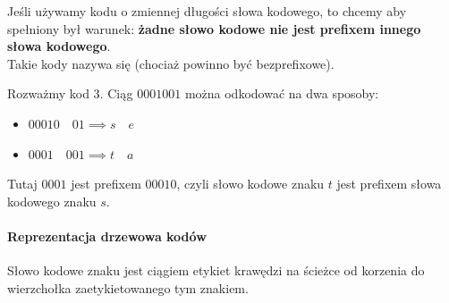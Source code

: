 Jeśli używamy kodu o zmiennej długości słowa kodowego, to chcemy aby spełniony był warunek: \textbf{żadne słowo kodowe nie jest prefixem innego słowa kodowego}. \\
Takie kody nazywa się  (chociaż powinno być bezprefixowe).

Rozważmy kod 3. Ciąg $0001001$ można odkodować na dwa sposoby:
\begin{itemize}[nosep]
	\item $00010 \quad 01 \implies s \quad e$
	\item $0001 \quad 001 \implies t \quad a$
\end{itemize}
Tutaj $0001$ jest prefixem $00010$, czyli słowo kodowe znaku $t$ jest prefixem słowa kodowego znaku $s$.

\paragraph{Reprezentacja drzewowa kodów}
Słowo kodowe znaku jest ciągiem etykiet krawędzi na ścieżce od korzenia do wierzchołka zaetykietowanego tym znakiem.

